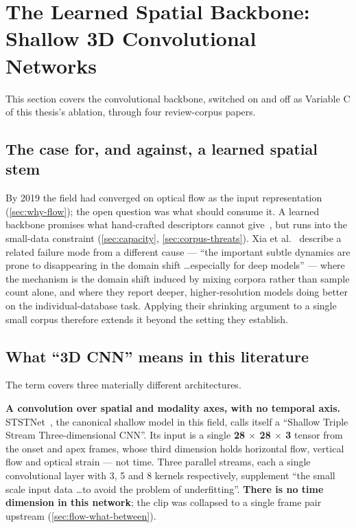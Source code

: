 
\section{The Learned Spatial Backbone: Shallow 3D Convolutional Networks}
\label{sec:cnn-review}

This section covers the convolutional backbone, switched on and off as Variable C of this thesis's ablation, through four review-corpus papers.

\subsection{The case for, and against, a learned spatial stem}
\label{sec:cnn-case}

By 2019 the field had converged on optical flow as the input representation (\autoref{sec:why-flow}); the open question was what should consume it. A learned backbone promises what hand-crafted descriptors cannot give~\cite{liong2019b}, but runs into the small-data constraint (\autoref{sec:capacity}, \autoref{sec:corpus-threats}). Xia et al.~\cite{xia2020b} describe a related failure mode from a different cause --- ``the important subtle dynamics are prone to disappearing in the domain shift \ldots especially for deep models'' --- where the mechanism is the domain shift induced by mixing corpora rather than sample count alone, and where they report deeper, higher-resolution models doing better on the individual-database task. Applying their shrinking argument to a single small corpus therefore extends it beyond the setting they establish.

\subsection{What ``3D CNN'' means in this literature}
\label{sec:cnn-meaning}

The term covers three materially different architectures.

\textbf{A convolution over spatial and modality axes, with no temporal axis.} STSTNet~\cite{liong2019b}, the canonical shallow model in this field, calls itself a ``Shallow Triple Stream Three-dimensional CNN''. Its input is a single \textbf{28 $\times$ 28 $\times$ 3} tensor from the onset and apex frames, whose third dimension holds horizontal flow, vertical flow and optical strain --- not time. Three parallel streams, each a single convolutional layer with 3, 5 and 8 kernels respectively, supplement ``the small scale input data \ldots to avoid the problem of underfitting''. \textbf{There is no time dimension in this network}; the clip was collapsed to a single frame pair upstream (\autoref{sec:flow-what-between}).

